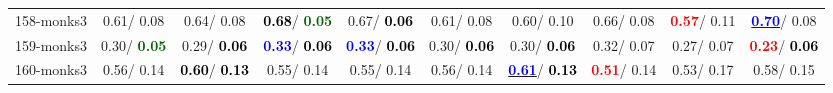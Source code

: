 \begin{table}[h]
\begin{center}
{\begin{tabular}{lc|c|c|c|c|c|c|c|c}
158-monks3 &   0.61/  0.08 &   0.64/  0.08 & \textcolor{black}{\textbf{  0.68}}/\textcolor{darkgreen}{\textbf{  0.05}} &   0.67/\textcolor{black}{\textbf{  0.06}} &   0.61/  0.08 &   0.60/  0.10 &   0.66/  0.08 & \textcolor{red}{\textbf{  0.57}}/  0.11 & \underline{\textcolor{blue}{\textbf{  0.70}}}/  0.08 \\
159-monks3 &   0.30/\textcolor{darkgreen}{\textbf{  0.05}} &   0.29/\textcolor{black}{\textbf{  0.06}} & \textcolor{blue}{\textbf{  0.33}}/\textcolor{black}{\textbf{  0.06}} & \textcolor{blue}{\textbf{  0.33}}/\textcolor{black}{\textbf{  0.06}} &   0.30/\textcolor{black}{\textbf{  0.06}} &   0.30/\textcolor{black}{\textbf{  0.06}} &   0.32/  0.07 &   0.27/  0.07 & \textcolor{red}{\textbf{  0.23}}/\textcolor{black}{\textbf{  0.06}} \\
160-monks3 &   0.56/  0.14 & \textcolor{black}{\textbf{  0.60}}/\textcolor{black}{\textbf{  0.13}} &   0.55/  0.14 &   0.55/  0.14 &   0.56/  0.14 & \underline{\textcolor{blue}{\textbf{  0.61}}}/\textcolor{black}{\textbf{  0.13}} & \textcolor{red}{\textbf{  0.51}}/  0.14 &   0.53/  0.17 &   0.58/  0.15 \\\end{tabular}}\label{stratsALCKappa4AllRedux50a}
\end{center}
\end{table}
